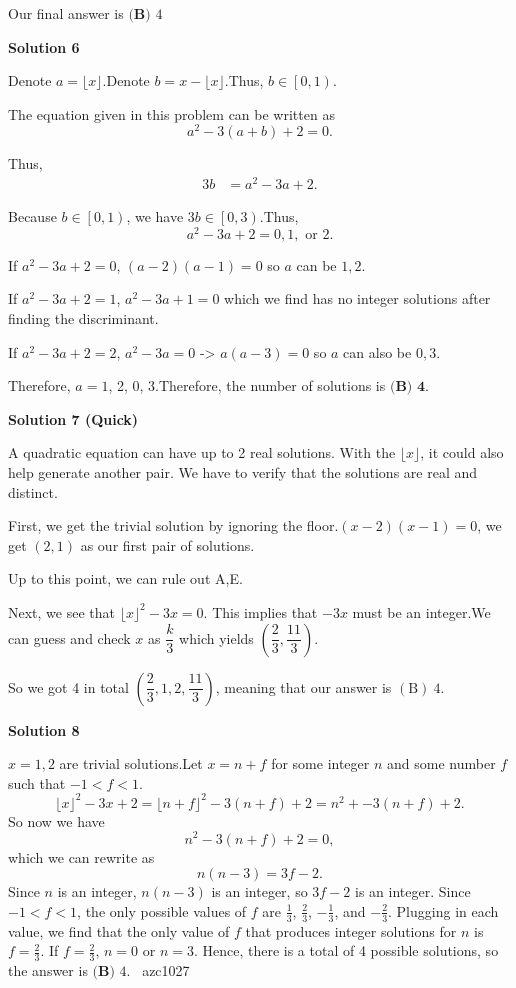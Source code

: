\begin{enumerate}
 Our final answer is $\boxed{\textbf{(B) }4}$




\textbf{Solution 6}

Denote $a = \lfloor x \rfloor$.Denote $b = x - \lfloor x \rfloor$.Thus, $b \in \left[ 0 , 1 \right)$.

 The equation given in this problem can be written as
 \[ a^2 - 3 \left( a + b \right) + 2 = 0 . \]

 Thus,
 \begin{align*} 3 b & = a^2 - 3 a + 2 . \end{align*}


 Because $b \in \left[ 0 , 1 \right)$, we have $3 b \in \left[ 0 , 3 \right)$.Thus, 
 \[ a^2 - 3 a + 2 = 0, 1, \mbox{ or } 2 . \]

 If $a^2-3a+2=0$, $(a-2)(a-1)=0$ so $a$ can be $1, 2$.

 If $a^2-3a+2=1$, $a^2-3a+1=0$ which we find has no integer solutions after finding the discriminant.

 If $a^2-3a+2=2$, $a^2-3a=0$ -> $a(a-3)=0$ so $a$ can also be $0, 3$.

 Therefore, $a = 1$, 2, 0, 3.Therefore, the number of solutions is $\boxed{\textbf{(B) 4}}$.

 



\textbf{Solution 7 (Quick)}

A quadratic equation can have up to 2 real solutions. With the $\lfloor{x}\rfloor$, it could also help generate another pair. We have to verify that the solutions are real and distinct.

 
First, we get the trivial solution by ignoring the floor.$(x-2)(x-1) = 0$, we get $(2,1)$ as our first pair of solutions.

 Up to this point, we can rule out A,E.

 Next, we see that $\lfloor{x}\rfloor^2-3x=0.$  This implies that $-3x$ must be an integer.We can guess and check $x$ as $\dfrac{k}{3}$ which yields $\left(\dfrac{2}{3},\dfrac{11}{3}\right).$

 So we got 4 in total $\left(\dfrac{2}{3},1,2,\dfrac{11}{3}\right)$, meaning that our answer is $\boxed{(\text{B}) \ 4}$.

 



\textbf{Solution 8}

$x=1, 2$ are trivial solutions.Let $x=n+f$ for some integer $n$ and some number $f$ such that $-1<f<1$. 
 \[\lfloor{x}\rfloor^2-3x+2= \lfloor{n+f}\rfloor^2-3(n+f)+2=n^2+-3(n+f)+2.\] So now we have
 \[n^2-3(n+f)+2 = 0,\]which we can rewrite as
 \[n(n-3)=3f-2.\]Since $n$ is an integer, $n(n-3)$ is an integer, so $3f-2$ is an integer. Since $-1<f<1$, the only possible values of $f$ are $\frac{1}{3}$, $\frac{2}{3}$, $-\frac{1}{3}$, and $-\frac{2}{3}$. Plugging in each value, we find that the only value of $f$ that produces integer solutions for $n$ is $f=\frac{2}{3}$. If $f=\frac{2}{3}$, $n=0$ or $n=3$. Hence, there is a total of 4 possible solutions, so the answer is $\boxed{\textbf{(B) }4}$. ~azc1027


\end{enumerate}
